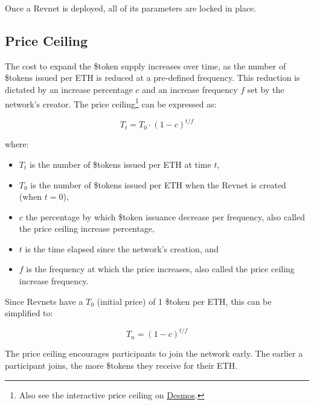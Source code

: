 \documentclass{article}
\begin{document}
Once a Revnet is deployed, all of its parameters are locked in place.

\clearpage

\subsection{Price Ceiling}

The cost to expand the \$token supply increases over time, as the number of \$tokens issued per ETH is reduced at a pre-defined frequency. This reduction is dictated by an increase percentage $c$ and an increase frequency $f$ set by the network's creator. The price ceiling\footnote{Also see the interactive price ceiling on \href{https://www.desmos.com/calculator/ey9fhuslwe}{Desmos}.} can be expressed as:

\begin{equation}
  T_t = T_0 \cdot (1 - c)^{t \slash f}
\end{equation}

where:
\begin{itemize}
  \item $T_t$ is the number of \$tokens issued per ETH at time $t$,
  \item $T_0$ is the number of \$tokens issued per ETH when the Revnet is created (when $t = 0$),
  \item $c$ the percentage by which \$token issuance decrease per frequency, also called the price ceiling increase percentage,
  \item $t$ is the time elapsed since the network's creation, and
  \item $f$ is the frequency at which the price increases, also called the price ceiling increase frequency.
\end{itemize}

Since Revnets have a $T_0$ (initial price) of 1 \$token per ETH, this can be simplified to:

\begin{equation}
  T_n = (1 - c)^{t \slash f}
\end{equation}

The price ceiling encourages participants to join the network early. The earlier a participant joins, the more \$tokens they receive for their ETH.
\end{document}
